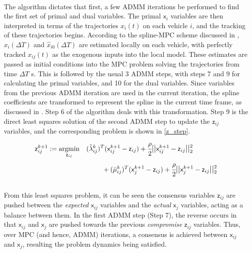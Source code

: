 \documentclass[letterpaper, 10 pt, conference]{ieeeconf}
\DeclareMathOperator*{\argmin}{argmin}
\newcommand{\cx}{\textsf{x}}
\newcommand{\cz}{\textsf{z}}
\begin{document}
\\
\indent
The algorithm dictates that first, a few ADMM iterations be performed to find the first set of primal and dual variables. The primal $\cx_{i}$ variables are then interpreted in terms of the trajectories $x_i(t)$ on each vehicle $i$, and the tracking of these trajectories begins. According to the spline-MPC scheme discussed in \cite{c16}, $\hat{x}_i(\Delta T)$ and $\hat{x}_{i0}(\Delta T)$ are estimated locally on each vehicle, with perfectly tracked $x_{ij}(t)$ as the exogenous inputs into the local model. These estimates are passed as initial conditions into the MPC problem solving the trajectories from time $\Delta T$ s. This is followed by the usual 3 ADMM steps, with steps 7 and 9 for calculating the primal variables, and 10 for the dual variables. Since variables from the previous ADMM iteration are used in the current iteration, the spline coefficients are transformed to represent the spline in the current time frame, as discussed in \cite{c16}. Step 6 of the algorithm deals with this transformation. Step 9 is the direct least squares solution of the second ADMM step to update the $\cz_{ij}$ variables, and the corresponding problem is shown in \eqref{z_step}.
\begin{equation}
\label{z_step}
\begin{aligned} \cz_{ij}^{k+1} &:=
 \argmin_{\cz_{ij}} \quad (\tilde{\lambda}^k_{ij})^T(\cx^{k+1}_{ij} - \cz_{ij}) + \cfrac{\rho}{2} \mathlarger{||}\cx^{k+1}_{ij} - \cz_{ij}\mathlarger{||}_2^2{{}} \\ & \qquad \qquad \qquad \qquad
+ (\tilde{\mu}^k_{ij})^T(\cx^{k+1}_{j} - \cz_{ij}) +
\cfrac{\rho}{2} \mathlarger{||}\cx^{k+1}_{j} - \cz_{ij}\mathlarger{||}_2^2 \mathlarger{}
\end{aligned}
\end{equation}
\\
\indent
From this least squares problem, it can be seen the consensus variables $\cz_{ij}$ are pushed between the \textit{expected} $\cx_{ij}$ variables and the \textit{actual} $\cx_j$ variables, acting as a balance between them. In the first ADMM step (Step 7), the reverse occurs in that $\cx_{ij}$ and $\cx_j$ are pushed towards the previous \textit{compromise} $\cz_{ij}$ variables. Thus, over MPC (and hence, ADMM) iterations, a consensus is achieved between $\cx_{ij}$ and $\cx_j$, resulting the problem dynamics being satisfied.
\end{document}
